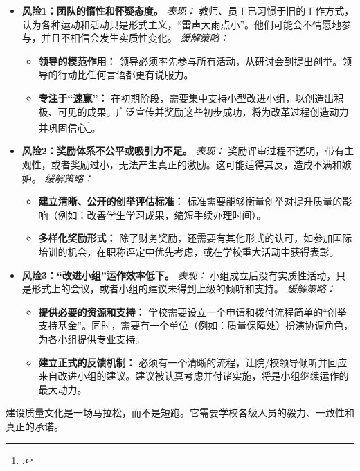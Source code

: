\begin{itemize}
    \item \textbf{风险1：团队的惰性和怀疑态度。}
    \textit{表现：} 教师、员工已习惯于旧的工作方式，认为各种运动和活动只是形式主义，“雷声大雨点小”。他们可能会不情愿地参与，并且不相信会发生实质性变化。
    \textit{缓解策略：}
    \begin{itemize}
        \item \textbf{领导的模范作用：} 领导必须率先参与所有活动，从研讨会到提出创举。领导的行动比任何言语都更有说服力。
        \item \textbf{专注于“速赢”：} 在初期阶段，需要集中支持小型改进小组，以创造出积极、可见的成果。广泛宣传并奖励这些初步成功，将为改革过程创造动力并巩固信心\footcite{kotter_leading_change}。
    \end{itemize}

    \item \textbf{风险2：奖励体系不公平或吸引力不足。}
    \textit{表现：} 奖励评审过程不透明，带有主观性，或者奖励过小，无法产生真正的激励。这可能适得其反，造成不满和嫉妒。
    \textit{缓解策略：}
    \begin{itemize}
        \item \textbf{建立清晰、公开的创举评估标准：} 标准需要能够衡量创举对提升质量的影响（例如：改善学生学习成果，缩短手续办理时间）。
        \item \textbf{多样化奖励形式：} 除了财务奖励，还需要有其他形式的认可，如参加国际培训的机会，在职称评定中优先考虑，或在学校重大活动中获得表彰。
    \end{itemize}

    \item \textbf{风险3：“改进小组”运作效率低下。}
    \textit{表现：} 小组成立后没有实质性活动，只是形式上的会议，或者小组的建议未得到上级的倾听和支持。
    \textit{缓解策略：}
    \begin{itemize}
        \item \textbf{提供必要的资源和支持：} 学校需要设立一个申请和拨付流程简单的“创举支持基金”。同时，需要有一个单位（例如：质量保障处）扮演协调角色，为各小组提供专业支持。
        \item \textbf{建立正式的反馈机制：} 必须有一个清晰的流程，让院/校领导倾听并回应来自改进小组的建议。建议被认真考虑并付诸实施，将是小组继续运作的最大动力。
    \end{itemize}
\end{itemize}

建设质量文化是一场马拉松，而不是短跑。它需要学校各级人员的毅力、一致性和真正的承诺。

